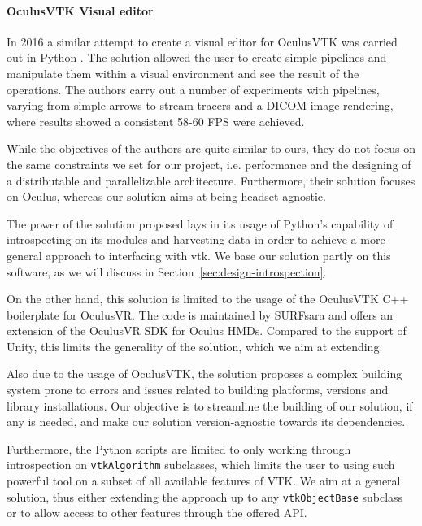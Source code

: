 \paragraph{OculusVTK Visual editor}

In 2016 a similar attempt to create a visual editor for OculusVTK was carried out in Python \cite{dreuning_visual_2016}. The solution allowed the user to create simple pipelines and manipulate them within a visual environment and see the result of the operations. The authors carry out a number of experiments with pipelines, varying from simple arrows to stream tracers and a DICOM image rendering, where results showed a consistent 58-60 FPS were achieved.

While the objectives of the authors are quite similar to ours, they do not focus on the same constraints we set for our project, i.e. performance and the designing of a distributable and parallelizable architecture. Furthermore, their solution focuses on Oculus, whereas our solution aims at being headset-agnostic.

The power of the solution proposed lays in its usage of Python's capability of introspecting on its modules and harvesting data in order to achieve a more general approach to interfacing with \acrshort{vtk}. We base our solution partly on this software, as we will discuss in Section~\ref{sec:design-introspection}.

On the other hand, this solution is limited to the usage of the OculusVTK C++ boilerplate for OculusVR. The code is maintained by SURFsara and offers an extension of the OculusVR SDK for Oculus HMDs. Compared to the support of Unity, this limits the generality of the solution, which we aim at extending.

Also due to the usage of OculusVTK, the solution proposes a complex building system prone to errors and issues related to building platforms, versions and library installations. Our objective is to streamline the building of our solution, if any is needed, and make our solution version-agnostic towards its dependencies. 

Furthermore, the Python scripts are limited to only working through introspection on \verb|vtkAlgorithm| subclasses, which limits the user to using such powerful tool on a subset of all available features of VTK. We aim at a general solution, thus either extending the approach up to any \verb|vtkObjectBase| subclass or to allow access to other features through the offered API.

